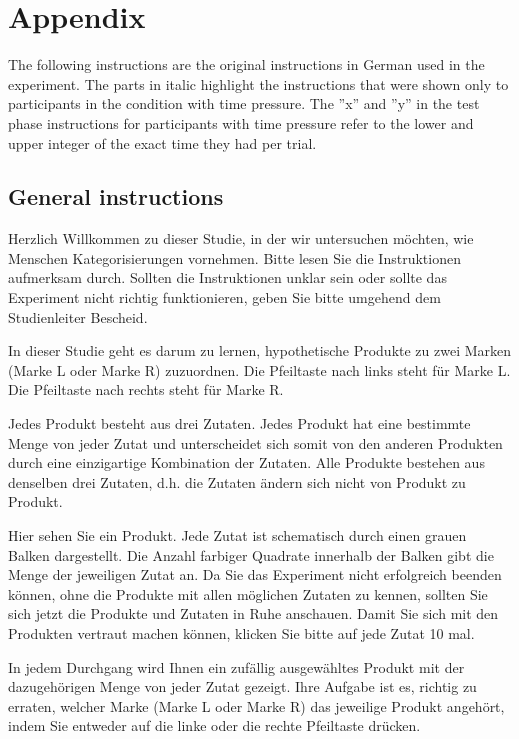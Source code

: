 \documentclass[a4paper,man,natbib]{apa6}
\begin{document}


\newpage
\section{Appendix}
The following instructions are the original instructions in German used in the experiment. The parts in italic highlight the instructions that were shown only to participants in the condition with time pressure. The ''x'' and ''y'' in the test phase instructions for participants with time pressure refer to the lower and upper integer of the exact time they had per trial.

\subsection{General instructions}
Herzlich Willkommen zu dieser Studie, in der wir untersuchen möchten, wie Menschen Kategorisierungen vornehmen.
Bitte lesen Sie die Instruktionen aufmerksam durch. Sollten die Instruktionen unklar sein oder sollte das Experiment nicht richtig funktionieren, geben Sie bitte umgehend dem Studienleiter Bescheid.

In dieser Studie geht es darum zu lernen, hypothetische Produkte zu zwei Marken (Marke L oder Marke R) zuzuordnen.
Die Pfeiltaste nach links steht für Marke L. Die Pfeiltaste nach rechts steht für Marke R.

Jedes Produkt besteht aus drei Zutaten. Jedes Produkt hat eine bestimmte Menge von jeder Zutat und unterscheidet sich somit von den anderen Produkten durch eine einzigartige Kombination der Zutaten.
Alle Produkte bestehen aus denselben drei Zutaten, d.h. die Zutaten ändern sich nicht von Produkt zu Produkt.

Hier sehen Sie ein Produkt. Jede Zutat ist schematisch durch einen grauen Balken dargestellt. Die Anzahl farbiger Quadrate innerhalb der Balken gibt die Menge der jeweiligen Zutat an.
Da Sie das Experiment nicht erfolgreich beenden können, ohne die Produkte mit allen möglichen Zutaten zu kennen, sollten Sie sich jetzt die Produkte und Zutaten in Ruhe anschauen.
Damit Sie sich mit den Produkten vertraut machen können, klicken Sie bitte auf jede Zutat 10 mal.

In jedem Durchgang wird Ihnen ein zufällig ausgewähltes Produkt mit der dazugehörigen Menge von jeder Zutat gezeigt. Ihre Aufgabe ist es, richtig zu erraten, welcher Marke (Marke L oder Marke R) das jeweilige Produkt angehört, indem Sie entweder auf die linke oder die rechte Pfeiltaste drücken.
\end{document}
